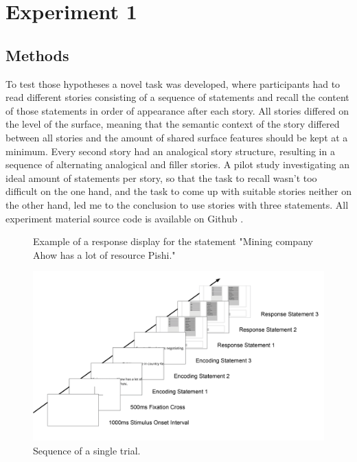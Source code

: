 \documentclass[a4paper,man,natbib,floatsintext,import]{apa6}
\begin{document}
\newpage
\section{Experiment 1}
\subsection{Methods}
To test those hypotheses a novel task was developed, where participants had to read different stories consisting of a sequence of statements and recall the content of those statements in order of appearance after each story. All stories differed on the level of the surface, meaning that the semantic context of the story differed between all stories and the amount of shared surface features should be kept at a minimum. Every second story had an analogical story structure, resulting in a sequence of alternating analogical and filler stories. A pilot study investigating an ideal amount of statements per story, so that the task to recall wasn't too difficult on the one hand, and the task to come up with suitable stories neither on the other hand, led me to the conclusion to use stories with three statements.
All experiment material source code is available on Github \citep{Oesch2016}.

\begin{figure}
\begin{center}
\caption{Example of a response display for the statement "Mining company Ahow has a lot of resource Pishi."}
\label{fig:example_response_menu}
\end{center}
\end{figure}

\begin{figure}
\begin{center}
\includegraphics[width=\textwidth]{figures/trial_sequence.png}
\caption{Sequence of a single trial.}
\label{fig:trial_sequence}
\end{center}
\end{figure}
\end{document}
